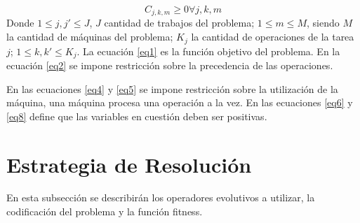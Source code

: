 \documentclass[journal]{IEEEtran}
\begin{document}
\begin{equation}
\label{eq8}
  C_{j,k,m} \geq 0 \forall j,k,m
\end{equation}
Donde $1 \leq j,j' \leq J$, $J$ cantidad de trabajos del problema; $1 \leq m \leq M$, siendo $M$ la cantidad de máquinas del problema; $K_{j}$ la cantidad de operaciones de la tarea $j$; $1\leq k,k' \leq K_{j}$.
La ecuación \eqref{eq1} es la función objetivo del problema.
En la ecuación \eqref{eq2} se impone restricción sobre la precedencia de las operaciones. 

En las ecuaciones \eqref{eq4} y \eqref{eq5} se impone restricción sobre la utilización de la máquina, una máquina procesa una operación a la vez.
En las ecuaciones \eqref{eq6} y \eqref{eq8} define que las variables en cuestión deben ser positivas.


\newpage


\section{Estrategia de Resolución}
En esta subsección se describirán los operadores evolutivos a utilizar, la codificación del problema y la función fitness.
\end{document}
